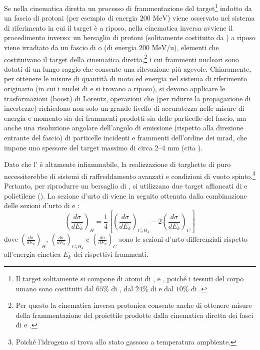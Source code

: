 \documentclass[12pt,a4paper,twoside]{report}
\begin{document}
	Se nella cinematica diretta un processo di frammentazione del target\footnote{Il target solitamente si compone di atomi di ,  e , poiché i tessuti del corpo umano sono costituiti dal $65\%$ di , dal $24\%$ di  e dal $10\%$ di .} indotto da un fascio di protoni (per esempio di energia $200\mbox{ MeV}$) viene osservato nel sistema di riferimento in cui il target è a riposo, nella cinematica inversa avviene il procedimento inverso: un bersaglio di protoni (solitamente costituito da ) a riposo viene irradiato da un fascio di  o  (di energia $200\mbox{ MeV/u}$), elementi che costituivano il target della cinematica diretta,\footnote{Per questo la cinematica inversa protonica consente anche di ottenere misure della frammentazione del proiettile prodotte dalla cinematica diretta dei fasci di  e .} i cui frammenti nucleari sono dotati di un lungo raggio che consente una rilevazione più agevole. Chiaramente, per ottenere le misure di quantità di moto ed energia nel sistema di riferimento originario (in cui i nuclei di  e  si trovano a riposo), si devono applicare le trasformazioni (boost) di Lorentz, operazioni che (per ridurre la propagazione di incertezze) richiedono non solo un grande livello di accuratezza nelle misure di energia e momento sia dei frammenti prodotti sia delle particelle del fascio, ma anche una risoluzione angolare dell'angolo di emissione (rispetto alla direzione entrante del fascio) di particelle incidenti e frammenti dell'ordine dei $\mbox{mrad}$, che impone uno spessore del target massimo di circa $2$--$4\mbox{ mm}$ (cita
	).
	
	Dato che l' è altamente infiammabile, la realizzazione di targhette di  puro necessiterebbe di sistemi di raffreddamento avanzati e condizioni di vuoto spinto.\footnote{Poiché l'idrogeno si trova allo stato gassoso a temperatura ampbiente.} Pertanto, per riprodurre un bersaglio di , si utilizzano due target affiancati di  e polietilene (). La sezione d'urto di  viene in seguito ottenuta dalla combinazione delle sezioni d'urto di  e :
	\begin{equation}
		\left(\frac{d\sigma}{dE_k}\right)_{H}=\frac{1}{4}\left[\left(\frac{d\sigma}{dE_k}\right)_{{C_2H_4}}-2\left(\frac{d\sigma}{dE_k}\right)_{{C}}\right]
		\label{eq:c2h4}
	\end{equation}
	dove $\left(\frac{d\sigma}{dE_k}\right)_{H}$, $\left(\frac{d\sigma}{dE_k}\right)_{{C_2H_4}}$ e $\left(\frac{d\sigma}{dE_k}\right)_{{C}}$ sono le sezioni d'urto differenziali rispetto all'energia cinetica $E_k$ dei rispettivi frammenti.
		
\end{document}
